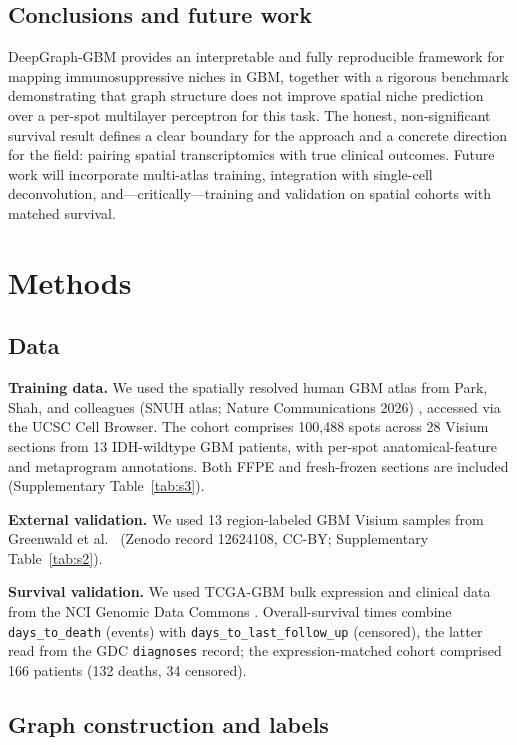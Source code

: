 \documentclass[11pt,letterpaper]{article}
\begin{document}
\subsection{Conclusions and future work}

DeepGraph-GBM provides an interpretable and fully reproducible framework for mapping immunosuppressive niches in GBM, together with a rigorous benchmark demonstrating that graph structure does not improve spatial niche prediction over a per-spot multilayer perceptron for this task. The honest, non-significant survival result defines a clear boundary for the approach and a concrete direction for the field: pairing spatial transcriptomics with true clinical outcomes. Future work will incorporate multi-atlas training, integration with single-cell deconvolution, and---critically---training and validation on spatial cohorts with matched survival.

\section{Methods}

\subsection{Data}

\textbf{Training data.} We used the spatially resolved human GBM atlas from Park, Shah, and colleagues (SNUH atlas; Nature Communications 2026) \cite{park2026}, accessed via the UCSC Cell Browser. The cohort comprises 100{,}488 spots across 28 Visium sections from 13 IDH-wildtype GBM patients, with per-spot anatomical-feature and metaprogram annotations. Both FFPE and fresh-frozen sections are included (Supplementary Table~\ref{tab:s3}).

\textbf{External validation.} We used 13 region-labeled GBM Visium samples from Greenwald et al.\ \cite{greenwald2024} (Zenodo record 12624108, CC-BY; Supplementary Table~\ref{tab:s2}).

\textbf{Survival validation.} We used TCGA-GBM bulk expression and clinical data from the NCI Genomic Data Commons \cite{tcga2008}. Overall-survival times combine \texttt{days\_to\_death} (events) with \texttt{days\_to\_last\_follow\_up} (censored), the latter read from the GDC \texttt{diagnoses} record; the expression-matched cohort comprised 166 patients (132 deaths, 34 censored).

\subsection{Graph construction and labels}
\end{document}
